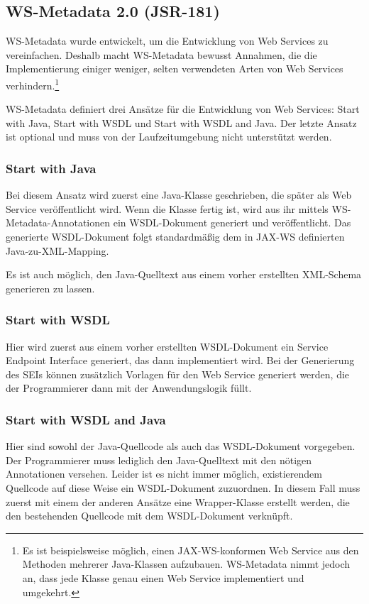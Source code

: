 \documentclass[runningheads]{llncs}
\newcommand{\germanquote}[1]{\glqq{}#1\grqq{}}
\begin{document}
  \label{jsr181}
  \subsection{WS-Metadata 2.0 (JSR-181)}
    WS-Metadata\cite{jsr_181} wurde entwickelt, um die Entwicklung von Web Services zu
    vereinfachen. Deshalb macht WS-Metadata bewusst Annahmen, die die Implementierung einiger
    weniger, selten verwendeten Arten von Web Services verhindern.\footnote{Es ist beispielsweise
    möglich, einen JAX-WS-konformen Web Service aus den Methoden mehrerer Java-Klassen aufzubauen.
    WS-Metadata nimmt jedoch an, dass jede Klasse genau einen Web Service implementiert und
    umgekehrt.}

    WS-Metadata definiert drei Ansätze für die Entwicklung von Web Services: \germanquote{Start
    with Java}, \germanquote{Start with WSDL} und \germanquote{Start with WSDL and Java}. Der
    letzte Ansatz ist optional und muss von der Laufzeitumgebung nicht unterstützt werden.

    \subsubsection*{Start with Java}
      Bei diesem Ansatz wird zuerst eine Java-Klasse geschrieben, die später als Web Service
      veröffentlicht wird. Wenn die Klasse fertig ist, wird aus ihr mittels
      WS-Metadata-Annotationen ein WSDL-Dokument generiert und veröffentlicht. Das generierte
      WSDL-Dokument folgt standardmäßig dem in JAX-WS definierten Java-zu-XML-Mapping.

      Es ist auch möglich, den Java-Quelltext aus einem vorher erstellten XML-Schema generieren zu
      lassen.

    \subsubsection*{Start with WSDL}
      Hier wird zuerst aus einem vorher erstellten WSDL-Do\-ku\-ment ein Service Endpoint Interface
      generiert, das dann implementiert wird. Bei der Generierung des SEIs können zusätzlich
      Vorlagen für den Web Service generiert werden, die der Programmierer dann mit der
      Anwendungslogik füllt.

    \subsubsection*{Start with WSDL and Java}
      Hier sind sowohl der Java-Quellcode als auch das WSDL-Dokument vorgegeben. Der Programmierer
      muss lediglich den Java-Quelltext mit den nötigen Annotationen versehen. Leider ist es nicht
      immer möglich, existierendem Quellcode auf diese Weise ein WSDL-Dokument zuzuordnen. In
      diesem Fall muss zuerst mit einem der anderen Ansätze eine Wrapper-Klasse erstellt werden,
      die den bestehenden Quellcode mit dem WSDL-Dokument verknüpft.
\end{document}
